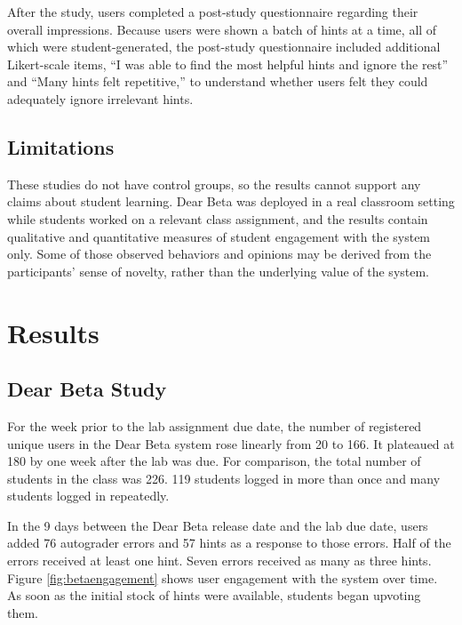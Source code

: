 After the study, users completed a post-study questionnaire regarding their overall impressions. Because users were shown a batch of hints at a time, all of which were student-generated, the post-study questionnaire included additional Likert-scale items, ``I was able to find the most helpful hints and ignore the rest'' and ``Many hints felt repetitive,'' to understand whether users felt they could adequately ignore irrelevant hints. 

\subsection{Limitations}
These studies do not have control groups, so the results cannot support any claims about student learning. Dear Beta was deployed in a real classroom setting while students worked on a relevant class assignment, and the results contain qualitative and quantitative measures of student engagement with the system only. Some of those observed behaviors and opinions may be derived from the participants' sense of novelty, rather than the underlying value of the system. %


\section{Results}

\subsection{Dear Beta Study}

For the week prior to the lab assignment due date, the number of registered unique users in the Dear Beta system rose linearly from 20 to 166. It plateaued at 180 by one week after the lab was due. For comparison, the total number of students in the class was 226. 119 students logged in more than once and many students logged in repeatedly.

In the 9 days between the Dear Beta release date and the lab due date, users added 76 autograder errors and 57 hints as a response to those errors. Half of the errors received at least one hint. Seven errors received as many as three hints. Figure \ref{fig:betaengagement} shows user engagement with the system over time. As soon as the initial stock of hints were available, students began upvoting them.

